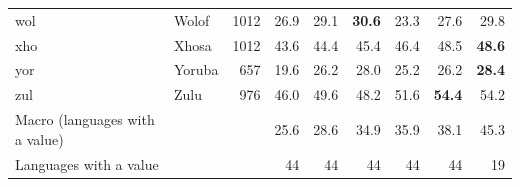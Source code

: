 {\begin{longtable}{@{}llrrrrrrr@{}}
wol & Wolof & 1012 & 26.9 & 29.1 & \textbf{30.6} & 23.3 & 27.6 & 29.8 \\
xho & Xhosa & 1012 & 43.6 & 44.4 & 45.4 & 46.4 & 48.5 & \textbf{48.6} \\
yor & Yoruba & 657 & 19.6 & 26.2 & 28.0 & 25.2 & 26.2 & \textbf{28.4} \\
zul & Zulu & 976 & 46.0 & 49.6 & 48.2 & 51.6 & \textbf{54.4} & 54.2 \\
\midrule
Macro (languages with a value) & & & 25.6 & 28.6 & 34.9 & 35.9 & 38.1 & 45.3 \\
Languages with a value & & & 44 & 44 & 44 & 44 & 44 & 19 \\
\end{longtable}}

